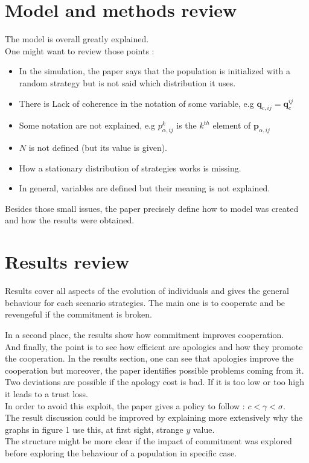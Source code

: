\documentclass{article}
\begin{document}
\section{Model and methods review}
The model is overall greatly explained.\\
One might want to review those points :
\begin{itemize}
\item In the simulation, the paper says that the population is initialized with a random strategy but is not said which distribution it uses.
\item There is Lack of coherence in the notation of some variable, e.g $\mathbf{q}_{c, ij} = \mathbf{q}_{c}^{ij}$
\item Some notation are not explained, e.g $p^{k}_{\alpha, ij}$ is the $k^{th}$ element of $\mathbf{p}_{\alpha,ij}$
\item $N$ is not defined (but its value is given).
\item How a stationary distribution of strategies works is missing.
\item In general, variables are defined but their meaning is not explained.
\end{itemize}
Besides those small issues, the paper precisely define how to model was created and how the results were obtained.


\section{Results review}
Results cover all aspects of the evolution of individuals and gives the general behaviour for each scenario strategies. The main one is to cooperate and be revengeful if the commitment is broken.

In a second place, the results show how commitment improves cooperation.\\

And finally, the point is to see how efficient are apologies and how they promote the cooperation. In the results section, one can see that apologies improve the cooperation but moreover, the paper identifies possible problems coming from it. \\
Two deviations are possible if the apology cost is bad. If it is too low or too high it leads to a trust loss.\\
In order to avoid this exploit, the paper gives a policy to follow : $c<\gamma<\sigma$.\\

The result discussion could be improved by explaining more extensively why the graphs in figure 1 use this, at first sight, strange $y$ value.\\
The structure might be more clear if the impact of commitment was explored before exploring the behaviour of a population in specific case.
\end{document}
